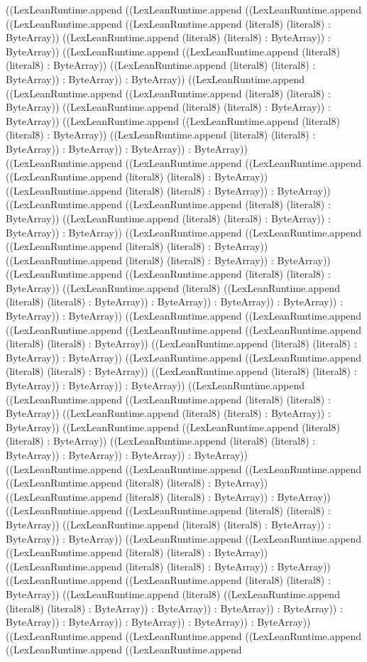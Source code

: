 \documentclass[11pt]{article}
\begin{document}
((LexLeanRuntime.append ((LexLeanRuntime.append ((LexLeanRuntime.append ((LexLeanRuntime.append ((LexLeanRuntime.append (literal8) (literal8) : ByteArray)) ((LexLeanRuntime.append (literal8) (literal8) : ByteArray)) : ByteArray)) ((LexLeanRuntime.append ((LexLeanRuntime.append (literal8) (literal8) : ByteArray)) ((LexLeanRuntime.append (literal8) (literal8) : ByteArray)) : ByteArray)) : ByteArray)) ((LexLeanRuntime.append ((LexLeanRuntime.append ((LexLeanRuntime.append (literal8) (literal8) : ByteArray)) ((LexLeanRuntime.append (literal8) (literal8) : ByteArray)) : ByteArray)) ((LexLeanRuntime.append ((LexLeanRuntime.append (literal8) (literal8) : ByteArray)) ((LexLeanRuntime.append (literal8) (literal8) : ByteArray)) : ByteArray)) : ByteArray)) : ByteArray)) ((LexLeanRuntime.append ((LexLeanRuntime.append ((LexLeanRuntime.append ((LexLeanRuntime.append (literal8) (literal8) : ByteArray)) ((LexLeanRuntime.append (literal8) (literal8) : ByteArray)) : ByteArray)) ((LexLeanRuntime.append ((LexLeanRuntime.append (literal8) (literal8) : ByteArray)) ((LexLeanRuntime.append (literal8) (literal8) : ByteArray)) : ByteArray)) : ByteArray)) ((LexLeanRuntime.append ((LexLeanRuntime.append ((LexLeanRuntime.append (literal8) (literal8) : ByteArray)) ((LexLeanRuntime.append (literal8) (literal8) : ByteArray)) : ByteArray)) ((LexLeanRuntime.append ((LexLeanRuntime.append (literal8) (literal8) : ByteArray)) ((LexLeanRuntime.append (literal8) ((LexLeanRuntime.append (literal8) (literal8) : ByteArray)) : ByteArray)) : ByteArray)) : ByteArray)) : ByteArray)) : ByteArray)) ((LexLeanRuntime.append ((LexLeanRuntime.append ((LexLeanRuntime.append ((LexLeanRuntime.append ((LexLeanRuntime.append (literal8) (literal8) : ByteArray)) ((LexLeanRuntime.append (literal8) (literal8) : ByteArray)) : ByteArray)) ((LexLeanRuntime.append ((LexLeanRuntime.append (literal8) (literal8) : ByteArray)) ((LexLeanRuntime.append (literal8) (literal8) : ByteArray)) : ByteArray)) : ByteArray)) ((LexLeanRuntime.append ((LexLeanRuntime.append ((LexLeanRuntime.append (literal8) (literal8) : ByteArray)) ((LexLeanRuntime.append (literal8) (literal8) : ByteArray)) : ByteArray)) ((LexLeanRuntime.append ((LexLeanRuntime.append (literal8) (literal8) : ByteArray)) ((LexLeanRuntime.append (literal8) (literal8) : ByteArray)) : ByteArray)) : ByteArray)) : ByteArray)) ((LexLeanRuntime.append ((LexLeanRuntime.append ((LexLeanRuntime.append ((LexLeanRuntime.append (literal8) (literal8) : ByteArray)) ((LexLeanRuntime.append (literal8) (literal8) : ByteArray)) : ByteArray)) ((LexLeanRuntime.append ((LexLeanRuntime.append (literal8) (literal8) : ByteArray)) ((LexLeanRuntime.append (literal8) (literal8) : ByteArray)) : ByteArray)) : ByteArray)) ((LexLeanRuntime.append ((LexLeanRuntime.append ((LexLeanRuntime.append (literal8) (literal8) : ByteArray)) ((LexLeanRuntime.append (literal8) (literal8) : ByteArray)) : ByteArray)) ((LexLeanRuntime.append ((LexLeanRuntime.append (literal8) (literal8) : ByteArray)) ((LexLeanRuntime.append (literal8) ((LexLeanRuntime.append (literal8) (literal8) : ByteArray)) : ByteArray)) : ByteArray)) : ByteArray)) : ByteArray)) : ByteArray)) : ByteArray)) : ByteArray)) : ByteArray)) ((LexLeanRuntime.append ((LexLeanRuntime.append ((LexLeanRuntime.append ((LexLeanRuntime.append ((LexLeanRuntime.append 
\end{document}
